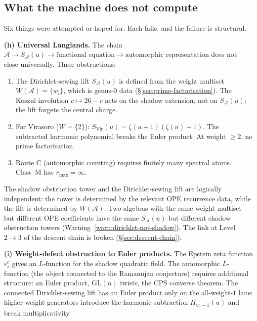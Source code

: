 \documentclass[11pt]{article}
\newcommand{\cA}{\mathcal{A}}
\begin{document}
\subsection{What the machine does not compute}

Six things were attempted or hoped for.  Each fails, and the
failure is structural.

\medskip

\noindent\textbf{(h) Universal Langlands.}\enspace
The chain
$\cA \to S_\cA(u) \to \text{functional equation} \to
\text{automorphic representation}$
does not close universally.  Three obstructions:

\begin{enumerate}[label=(\roman*),nosep]
\item The Dirichlet-sewing lift $S_\cA(u)$ is defined from the
  weight multiset $W(\cA) = \{w_i\}$, which is genus-$0$ data
  (\S\ref{sec:prime-factorisation}).  The Koszul involution
  $c \mapsto 26 - c$ acts on the shadow extension, not on
  $S_\cA(u)$: the lift forgets the central charge.
\item For Virasoro ($W = \{2\}$):
  $S_{\mathrm{Vir}}(u) = \zeta(u{+}1)(\zeta(u) - 1)$. The
  subtracted harmonic polynomial breaks the Euler product.  At
  weight $\geq 2$, no prime factorisation.
\item Route C (automorphic counting) requires finitely many
  spectral atoms.  Class~M has $r_{\max} = \infty$.
\end{enumerate}

The shadow obstruction tower and the Dirichlet-sewing lift are logically
independent: the tower is determined by the relevant OPE recurrence
data, while the lift is determined by $W(\cA)$.  Two algebras with the same weight
multiset but different OPE coefficients have the same
$S_\cA(u)$ but different shadow obstruction towers
(Warning~\ref{warn:dirichlet-not-shadow}).  The link at
Level~$2 \to 3$ of the descent chain is broken
(\S\ref{sec:descent-chain}).

\medskip

\noindent\textbf{(i) Weight-defect obstruction to Euler products.}\enspace
The Epstein zeta function $\varepsilon^c_s$ gives an
$L$-function for the shadow quadratic field.  The automorphic
$L$-function (the object connected to the Ramanujan
conjecture) requires additional structure: an Euler product,
$\mathrm{GL}(n)$ twists, the CPS converse theorem.  The connected
Dirichlet-sewing lift has an Euler product only on the all-weight-$1$
lane; higher-weight generators introduce the harmonic subtraction
$H_{w_i-1}(u)$ and break multiplicativity.
\end{document}
